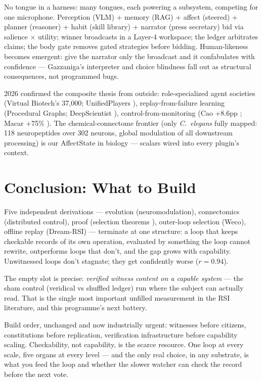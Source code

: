 \documentclass[11pt]{article}
\begin{document}
No tongue in a harness: many tongues, each powering a subsystem, competing for one microphone. Perception (VLM) + memory (RAG) + affect (steered) + planner (reasoner) + habit (skill library) + narrator (press secretary) bid via salience $\times$ utility; winner broadcasts in a Layer-4 workspace; the ledger arbitrates claims; the body gate removes gated strategies before bidding. Human-likeness becomes emergent: give the narrator only the broadcast and it confabulates with confidence --- Gazzaniga's interpreter and choice blindness fall out as structural consequences, not programmed bugs.

2026 confirmed the composite thesis from outside: role-specialized agent societies (Virtual Biotech's 37,000; UnifiedPlayers \citep{unifiedplayers2026}), replay-from-failure learning (Procedural Graphs; DeepScientist \citep{deepscientist2026}), control-from-monitoring (Cao +8.6pp \citep{cao2026}; Macar +75\% \citep{macar2026}). The chemical-connectome frontier (only \textit{C.~elegans} fully mapped: 118 neuropeptides over 302 neurons, global modulation of all downstream processing) is our AffectState in biology --- scalars wired into every plugin's context.

\section{Conclusion: What to Build}
\label{sec:close}

Five independent derivations --- evolution (neuromodulation), connectomics (distributed control), proof (selection theorems \citep{nayebi2026}), outer-loop selection (Weco), offline replay (Dream-RSI) --- terminate at one structure: a loop that keeps checkable records of its own operation, evaluated by something the loop cannot rewrite, outperforms loops that don't, and the gap grows with capability. Unwitnessed loops don't stagnate; they get confidently worse ($r=0.94$).

The empty slot is precise: \emph{verified witness content on a capable system} --- the sham control (veridical vs shuffled ledger) run where the subject can actually read. That is the single most important unfilled measurement in the RSI literature, and this programme's next battery.

Build order, unchanged and now industrially urgent: witnesses before citizens, constitutions before replication, verification infrastructure before capability scaling. Checkability, not capability, is the scarce resource. One loop at every scale, five organs at every level --- and the only real choice, in any substrate, is what you feed the loop and whether the slower watcher can check the record before the next vote.
\end{document}

